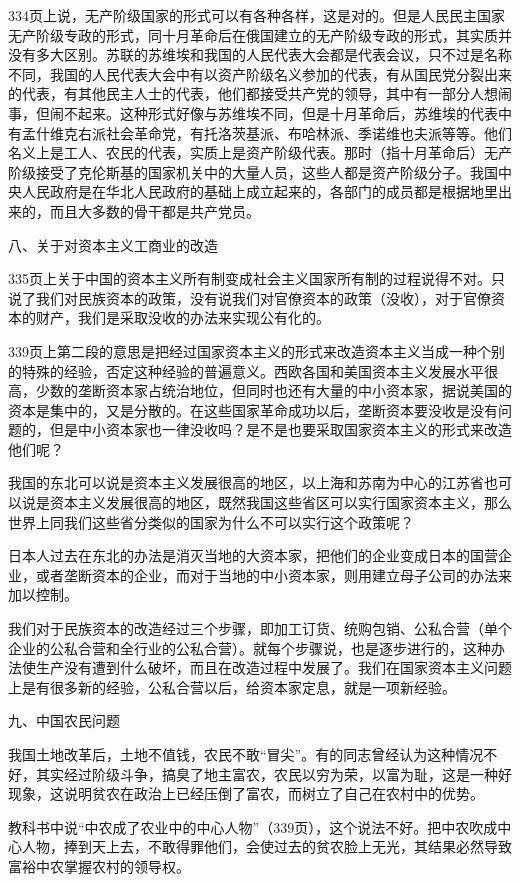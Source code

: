 334页上说，无产阶级国家的形式可以有各种各样，这是对的。但是人民民主国家无产阶级专政的形式，同十月革命后在俄国建立的无产阶级专政的形式，其实质并没有多大区别。苏联的苏维埃和我国的人民代表大会都是代表会议，只不过是名称不同，我国的人民代表大会中有以资产阶级名义参加的代表，有从国民党分裂出来的代表，有其他民主人士的代表，他们都接受共产党的领导，其中有一部分人想闹事，但闹不起来。这种形式好像与苏维埃不同，但是十月革命后，苏维埃的代表中有孟什维克右派社会革命党，有托洛茨基派、布哈林派、季诺维也夫派等等。他们名义上是工人、农民的代表，实质上是资产阶级代表。那时（指十月革命后）无产阶级接受了克伦斯基的国家机关中的大量人员，这些人都是资产阶级分子。我国中央人民政府是在华北人民政府的基础上成立起来的，各部门的成员都是根据地里出来的，而且大多数的骨干都是共产党员。

八、关于对资本主义工商业的改造

335页上关于中国的资本主义所有制变成社会主义国家所有制的过程说得不对。只说了我们对民族资本的政策，没有说我们对官僚资本的政策（没收），对于官僚资本的财产，我们是采取没收的办法来实现公有化的。

339页上第二段的意思是把经过国家资本主义的形式来改造资本主义当成一种个别的特殊的经验，否定这种经验的普遍意义。西欧各国和美国资本主义发展水平很高，少数的垄断资本家占统治地位，但同时也还有大量的中小资本家，据说美国的资本是集中的，又是分散的。在这些国家革命成功以后，垄断资本要没收是没有问题的，但是中小资本家也一律没收吗？是不是也要采取国家资本主义的形式来改造他们呢？

我国的东北可以说是资本主义发展很高的地区，以上海和苏南为中心的江苏省也可以说是资本主义发展很高的地区，既然我国这些省区可以实行国家资本主义，那么世界上同我们这些省分类似的国家为什么不可以实行这个政策呢？

日本人过去在东北的办法是消灭当地的大资本家，把他们的企业变成日本的国营企业，或者垄断资本的企业，而对于当地的中小资本家，则用建立母子公司的办法来加以控制。

我们对于民族资本的改造经过三个步骤，即加工订货、统购包销、公私合营（单个企业的公私合营和全行业的公私合营）。就每个步骤说，也是逐步进行的，这种办法使生产没有遭到什么破坏，而且在改造过程中发展了。我们在国家资本主义问题上是有很多新的经验，公私合营以后，给资本家定息，就是一项新经验。

九、中国农民问题

我国土地改革后，土地不值钱，农民不敢“冒尖”。有的同志曾经认为这种情况不好，其实经过阶级斗争，搞臭了地主富农，农民以穷为荣，以富为耻，这是一种好现象，这说明贫农在政治上已经压倒了富农，而树立了自己在农村中的优势。

教科书中说“中农成了农业中的中心人物”（339页），这个说法不好。把中农吹成中心人物，捧到天上去，不敢得罪他们，会使过去的贫农脸上无光，其结果必然导致富裕中农掌握农村的领导权。

